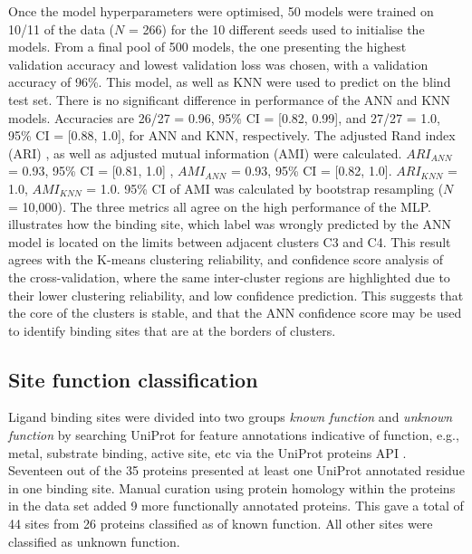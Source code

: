 Once the model hyperparameters were optimised, 50 models were trained on 10/11 of the data ($N$ = 266) for the 10 different seeds used to initialise the models. From a final pool of 500 models, the one presenting the highest validation accuracy and lowest validation loss was chosen, with a validation accuracy of 96\%. This model, as well as KNN were used to predict on the blind test set. There is no significant difference in performance of the ANN and KNN models. Accuracies are 26/27 = 0.96, 95\% CI = [0.82, 0.99], and 27/27 = 1.0, 95\% CI = [0.88, 1.0], for ANN and KNN, respectively. The adjusted Rand index (ARI) \cite{RAND_1971_ARI, HUBERT_1985_ARI}, as well as adjusted mutual information (AMI) \cite{VINH_2009_AMI, VINH_2010_AMI} were calculated. $ARI_{ANN}$ = 0.93, 95\% CI = [0.81, 1.0] \cite{STEINLEY_2016_ARI}, $AMI_{ANN}$ = 0.93, 95\% CI = [0.82, 1.0]. $ARI_{KNN}$ = 1.0, $AMI_{KNN}$ = 1.0. 95\% CI of AMI was calculated by bootstrap resampling ($N$ = 10,000). The three metrics all agree on the high performance of the MLP.  illustrates how the binding site, which label was wrongly predicted by the ANN model is located on the limits between adjacent clusters C3 and C4. This result agrees with the K-means clustering reliability, and confidence score analysis of the cross-validation, where the same inter-cluster regions are highlighted due to their lower clustering reliability, and low confidence prediction. This suggests that the core of the clusters is stable, and that the ANN confidence score may be used to identify binding sites that are at the borders of clusters.

\subsection{Site function classification}

Ligand binding sites were divided into two groups \textit{known function} and \textit{unknown function} by searching UniProt \cite{UNIPROT_2019_UNIPROT} for feature annotations indicative of function, e.g., metal, substrate binding, active site, etc via the UniProt proteins API \cite{NIGHTINGALE_2017_API}. Seventeen out of the 35 proteins presented at least one UniProt annotated residue in one binding site. Manual curation using protein homology within the proteins in the data set added 9 more functionally annotated proteins. This gave a total of 44 sites from 26 proteins classified as of known function. All other sites were classified as unknown function.

